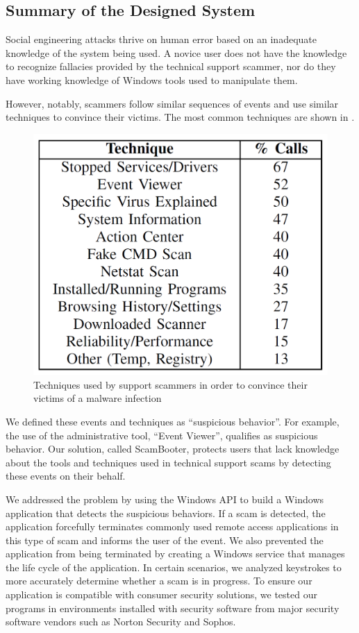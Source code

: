 \documentclass[final]{IEEEtran}
\begin{document}
\subsection{Summary of the Designed System}
Social engineering attacks thrive on human error based on an inadequate knowledge of the system being used. A novice user does not have the knowledge to recognize fallacies provided by the technical support scammer, nor do they have working knowledge of Windows tools used to manipulate them.

However, notably, scammers follow similar sequences of events and use similar techniques to convince their victims. The most common techniques are shown in \cite[Fig 4]{b2}.
\begin{figure}[htbp]
\centerline{\includegraphics[keepaspectratio=true, scale = 0.20]{image3.png}}
\caption{Techniques used by support scammers in order to convince their victims of a malware infection}
\label{fig4}
\end{figure}

We defined these events and techniques as ``suspicious behavior''. For example, the use of the administrative tool, ``Event Viewer'', qualifies as suspicious behavior. Our solution, called ScamBooter, protects users that lack knowledge about the tools and techniques used in technical support scams by detecting these events on their behalf.

We addressed the problem by using the Windows API to build a Windows application that detects the suspicious behaviors. If a scam is detected, the application forcefully terminates commonly used remote access applications in this type of scam and informs the user of the event. We also prevented the application from being terminated by creating a Windows service that manages the life cycle of the application. In certain scenarios, we analyzed keystrokes to more accurately determine whether a scam is in progress. To ensure our application is compatible with consumer security solutions, we tested our programs in environments installed with security software from major security software vendors such as Norton Security and Sophos.
\end{document}
